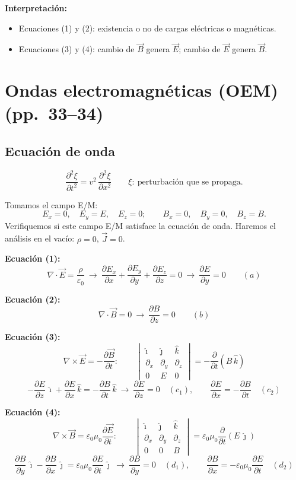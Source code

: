 \documentclass[11pt,a4paper]{article}
\newcommand{\pags}[1]{{\normalfont\small\color{gris}(pp.~#1)}}
\newcommand{\ii}{\hat{\imath}}
\newcommand{\jj}{\hat{\jmath}}
\newcommand{\kk}{\hat{k}}
\begin{document}
\textbf{Interpretación:}
\begin{itemize}
  \item Ecuaciones (1) y (2): existencia o no de cargas eléctricas o magnéticas.
  \item Ecuaciones (3) y (4): cambio de $\vec B$ genera $\vec E$; cambio de $\vec E$ genera $\vec B$.
\end{itemize}

\section{Ondas electromagnéticas (OEM) \pags{33--34}}

\subsection{Ecuación de onda}
\[
\frac{\partial^2\xi}{\partial t^2}=v^2\,\frac{\partial^2\xi}{\partial x^2}
\qquad \xi:\ \text{perturbación que se propaga.}
\]

Tomamos el campo E/M:
\[
E_x=0,\quad E_y=E,\quad E_z=0;\qquad B_x=0,\quad B_y=0,\quad B_z=B.
\]
Verifiquemos si este campo E/M satisface la ecuación de onda. Haremos el análisis en el vacío: $\rho=0$, $\vec J=0$.

\textbf{Ecuación (1):}
\[
\nabla\cdot\vec E=\frac{\rho}{\varepsilon_0}\ \rightarrow\
\frac{\partial E_x}{\partial x}+\frac{\partial E_y}{\partial y}+\frac{\partial E_z}{\partial z}=0
\ \rightarrow\ \frac{\partial E}{\partial y}=0 \qquad (a)
\]

\textbf{Ecuación (2):}
\[
\nabla\cdot\vec B=0\ \rightarrow\ \frac{\partial B}{\partial z}=0 \qquad (b)
\]

\textbf{Ecuación (3):}
\[
\nabla\times\vec E=-\frac{\partial\vec B}{\partial t}:\qquad
\begin{vmatrix}\ii&\jj&\kk\\ \partial_x&\partial_y&\partial_z\\ 0&E&0\end{vmatrix}
=-\frac{\partial}{\partial t}\left(B\,\kk\right)
\]
\[
-\frac{\partial E}{\partial z}\,\ii+\frac{\partial E}{\partial x}\,\kk=-\frac{\partial B}{\partial t}\,\kk
\ \rightarrow\
\frac{\partial E}{\partial z}=0\quad(c_1),\qquad
\frac{\partial E}{\partial x}=-\frac{\partial B}{\partial t}\quad(c_2)
\]

\textbf{Ecuación (4):}
\[
\nabla\times\vec B=\varepsilon_0\mu_0\frac{\partial\vec E}{\partial t}:\qquad
\begin{vmatrix}\ii&\jj&\kk\\ \partial_x&\partial_y&\partial_z\\ 0&0&B\end{vmatrix}
=\varepsilon_0\mu_0\frac{\partial}{\partial t}\left(E\,\jj\right)
\]
\[
\frac{\partial B}{\partial y}\,\ii-\frac{\partial B}{\partial x}\,\jj=\varepsilon_0\mu_0\frac{\partial E}{\partial t}\,\jj
\ \rightarrow\
\frac{\partial B}{\partial y}=0\quad(d_1),\qquad
\frac{\partial B}{\partial x}=-\varepsilon_0\mu_0\frac{\partial E}{\partial t}\quad(d_2)
\]
\end{document}
